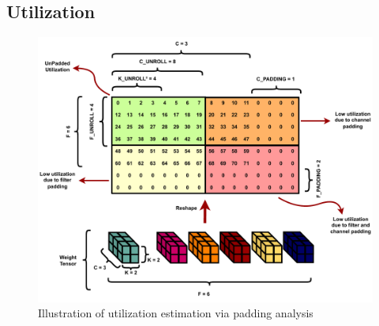 


\subsection{Utilization}
\label{chap:dataflow_dse:exploring:tempo_model:utilization}

\begin{figure}[]
    \centering
    \includegraphics[scale=0.45]{fig/Lasso_ilus.pdf}
    \caption{Illustration of utilization estimation via padding analysis}
    \label{fig:tempo_model}
\end{figure}

